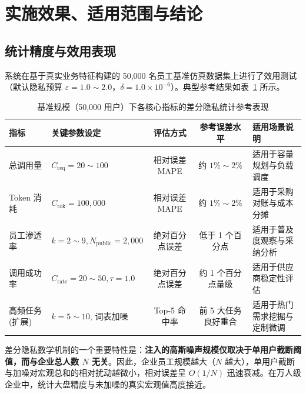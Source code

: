 \section{实施效果、适用范围与结论}
\label{sec:utility_and_conclusion}

\subsection{统计精度与效用表现}
系统在基于真实业务特征构建的 50,000 名员工基准仿真数据集上进行了效用测试（默认隐私预算 $\varepsilon = 1.0 \sim 2.0$，$\delta = 1.0 \times 10^{-6}$）。典型参考结果如表~\ref{tab:utility_summary} 所示。

\begin{table}[htbp]
\centering
\small
\renewcommand{\arraystretch}{1.08}
\caption{基准规模（50,000 用户）下各核心指标的差分隐私统计参考表现}
\label{tab:utility_summary}
\begin{tabularx}{\textwidth}{p{2.6cm}>{\raggedright\arraybackslash}p{3.8cm}cc>{\raggedright\arraybackslash}X}
\toprule
\textbf{指标} & \textbf{关键参数设定} & \textbf{评估方式} & \textbf{参考误差水平} & \textbf{适用场景说明} \\
\midrule
总调用量 & $C_{\text{req}} = 20 \sim 100$ & 相对误差 MAPE & 约 $1\% \sim 2\%$ & 适用于容量规划与负载调度 \\
Token 消耗 & $C_{\text{tok}} = 100,000$ & 相对误差 MAPE & 约 $1\% \sim 2\%$ & 适用于采购对账与成本分摊 \\
员工渗透率 & $k=2 \sim 9, N_{\text{public}}=2,000$ & 绝对百分点误差 & 低于 1 个百分点 & 适用于普及度观察与采纳分析 \\
调用成功率 & $C_{\text{rate}} = 20 \sim 50, \tau=1.0$ & 绝对百分点误差 & 约 1 个百分点量级 & 适用于供应商稳定性评估 \\
高频任务 (扩展) & $k=5 \sim 10$, 词表加噪 & Top-5 命中率 & 前 5 大任务良好重合 & 适用于热门需求挖掘与定制微调 \\
\bottomrule
\end{tabularx}
\end{table}

差分隐私数学机制的一个重要特性是：\textbf{注入的高斯噪声规模仅取决于单用户截断阈值，而与企业总人数 $N$ 无关}。因此，企业员工规模越大（$N$ 越大），单用户截断与加噪对宏观总和的相对扰动越微小，相对误差呈 $O(1/N)$ 迅速衰减。在万人级企业中，统计大盘精度与未加噪的真实宏观值高度接近。

